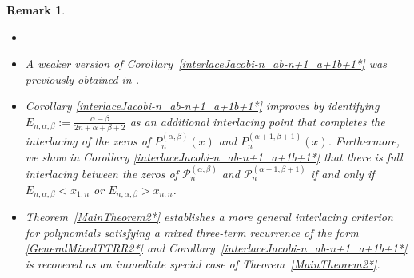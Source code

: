 \documentclass[final,3p,times,12pt]{elsarticle}
\newtheorem{remark}{Remark}[section]
\numberwithin{equation}{section}  %
\begin{document}
\begin{remark}\label{rmk1:interlaceJacobi-n_ab-n_a+1b+1}  
	\begin{itemize}
		\item[]
		\item[(i)] A weaker version of Corollary~\ref{interlaceJacobi-n_ab-n+1_a+1b+1*} was previously obtained in \cite[Theorem~3]{Arvesu-Driver-Littlejohn-RamanujanJ-2023}.
		\item[(ii)] Corollary \ref{interlaceJacobi-n_ab-n+1_a+1b+1*} improves \cite[Theorem 3]{Arvesu-Driver-Littlejohn-RamanujanJ-2023} by identifying $E_{n,\alpha,\beta}:=\frac{\alpha-\beta}{2n+\alpha+\beta+2}$ as an additional interlacing point that completes the interlacing of the zeros of $P^{(\alpha, \beta)}_n(x)$ and $P^{(\alpha+1, \beta+1)}_{n}(x)$. Furthermore, we show in Corollary \ref{interlaceJacobi-n_ab-n+1_a+1b+1*} that there is full interlacing between the zeros of $\mathcal{P}_n^{(\alpha,\beta)}$ and $\mathcal{P}_n^{(\alpha+1,\beta+1)}$ if and only if $E_{n,\alpha,\beta}<x_{1,n}$ or $E_{n,\alpha,\beta}>x_{n,n}$.
		\item[(iii)]Theorem~\ref{MainTheorem2*} establishes a more general interlacing criterion for polynomials satisfying a mixed three-term recurrence of the form \eqref{GeneralMixedTTRR2*} and Corollary~\ref{interlaceJacobi-n_ab-n+1_a+1b+1*} is recovered as an immediate special case of Theorem~\ref{MainTheorem2*}.
		
	\end{itemize}
	
\end{remark}
\end{document}
